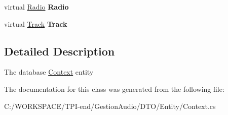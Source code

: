 \begin{DoxyCompactItemize}
\item 
\mbox{\label{class_d_t_o_1_1_entity_1_1_context_a219a9f7f1f384c922ef9ff2488dd9eb4}} 
virtual \hyperlink{class_d_t_o_1_1_entity_1_1_radio}{Radio} {\bfseries Radio}
\item 
\mbox{\label{class_d_t_o_1_1_entity_1_1_context_ac3399d9b072291f7462183c92868049a}} 
virtual \hyperlink{class_d_t_o_1_1_entity_1_1_track}{Track} {\bfseries Track}
\end{DoxyCompactItemize}


\subsection{Detailed Description}
The database \hyperlink{class_d_t_o_1_1_entity_1_1_context}{Context} entity 



The documentation for this class was generated from the following file\+:\begin{DoxyCompactItemize}
\item 
C\+:/\+W\+O\+R\+K\+S\+P\+A\+C\+E/\+T\+P\+I-\/end/\+Gestion\+Audio/\+D\+T\+O/\+Entity/Context.\+cs\end{DoxyCompactItemize}
